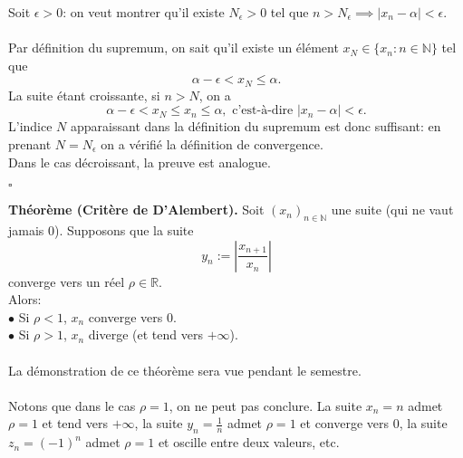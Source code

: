 \documentclass[oneside,11pt,french,table]{book}
\theoremstyle{definition}
\theoremstyle{plain}
\theoremstyle{remark}
\begin{document}
Soit $\epsilon > 0$: on veut montrer qu'il existe $N_\epsilon > 0$ tel que $n > N_\epsilon \implies | x_n - \alpha | < \epsilon.$ \\ \\
Par définition du supremum, on sait qu'il existe un élément $x_N \in \{ x_n : n \in \mathbb{N} \}$ tel que $$\alpha - \epsilon < x_N \leq \alpha.$$
La suite étant croissante, si $n > N$, on a $$\alpha - \epsilon < x_N \leq x_n \leq \alpha, \text{ c'est-à-dire } | x_n - \alpha | < \epsilon.$$
L'indice $N$ apparaissant dans la définition du supremum est donc suffisant: en prenant $N = N_\epsilon$ on a vérifié la définition de convergence. \\
Dans le cas décroissant, la preuve est analogue.
\begin{flushright}
$\square$
\end{flushright}
\textbf{Théorème (Critère de D'Alembert).} Soit $(x_n)_{n \in \mathbb{N}}$ une suite (qui ne vaut jamais 0). Supposons que la suite $$y_n := \left| \dfrac{x_{n+1}}{x_n} \right|$$
converge vers un réel $\rho \in \mathbb{R}$. \\
Alors: \\
$\bullet$ Si $\rho < 1$, $x_n$ converge vers 0. \\
$\bullet$ Si $\rho > 1$, $x_n$ diverge (et tend vers $+\infty$). \\
\\
La démonstration de ce théorème sera vue pendant le semestre. \\
\\
Notons que dans le cas $\rho = 1$, on ne peut pas conclure. La suite $x_n = n$ admet $\rho = 1$ et tend vers $+\infty$, la suite $y_n = \frac{1}{n}$ admet $\rho = 1$ et converge vers 0, la suite $z_n = (-1)^n$ admet $\rho = 1$ et oscille entre deux valeurs, etc.
\end{document}
